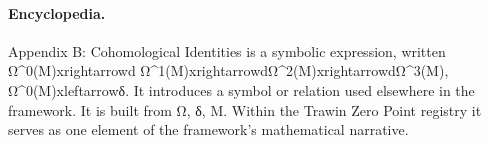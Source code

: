 \paragraph{Encyclopedia.}
Appendix B: Cohomological Identities is a symbolic expression, written Ω\textasciicircum{}0(M)xrightarrowd Ω\textasciicircum{}1(M)xrightarrowdΩ\textasciicircum{}2(M)xrightarrowdΩ\textasciicircum{}3(M), Ω\textasciicircum{}0(M)xleftarrowδ. It introduces a symbol or relation used elsewhere in the framework. It is built from Ω, δ, M. Within the Trawin Zero Point registry it serves as one element of the framework's mathematical narrative.

